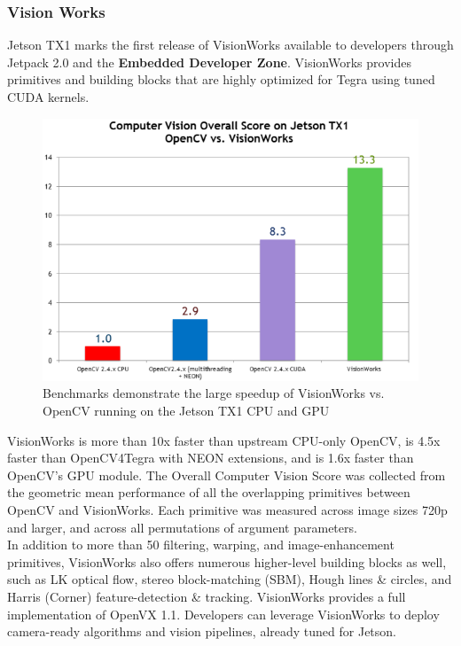         \subsubsection{Vision Works}
            Jetson TX1 marks the first release of VisionWorks available to developers through Jetpack 2.0 and the \textbf{Embedded Developer Zone}. VisionWorks provides primitives and building blocks that are highly optimized for Tegra using tuned CUDA kernels.
            \begin{figure}[H]
                \centering
                \includegraphics[width=0.6\linewidth]{img/tx1-benchmark.png}
                \caption{Benchmarks demonstrate the large speedup of VisionWorks vs. OpenCV running on the Jetson TX1 CPU and GPU}
            \end{figure}
            VisionWorks is more than 10x faster than upstream CPU-only OpenCV, is 4.5x faster than OpenCV4Tegra with NEON extensions, and is 1.6x faster than OpenCV’s GPU module. The Overall Computer Vision Score was collected from the geometric mean performance 
            of all the overlapping primitives between OpenCV and VisionWorks. Each primitive was measured across image sizes 720p and larger, and across all permutations of argument parameters. \\ 
            \vspace{3mm}
            In addition to more than 50 filtering, warping, and image-enhancement primitives, VisionWorks also offers numerous higher-level building blocks as well, such as LK optical flow, stereo block-matching (SBM), Hough lines \& circles, and Harris (Corner) 
            feature-detection \& tracking. VisionWorks provides a full implementation of OpenVX 1.1. Developers can leverage VisionWorks to deploy camera-ready algorithms and vision pipelines, already tuned for Jetson.

